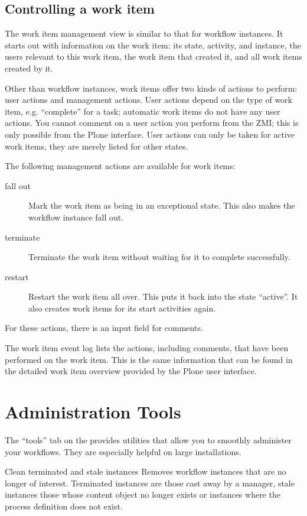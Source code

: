 \subsection{Controlling a work item}

The work item management view is similar to that for workflow instances. It
starts out with information on the work item: its state, activity, and
instance, the users relevant to this work item, the work item that created it,
and all work items created by it.

Other than workflow instances, work items offer two kinds of actions to
perform: user actions and management actions. User actions depend on the type
of work item, e.g. ``complete'' for a task; automatic work items do not have
any user actions. You cannot comment on a user action you perform from the
ZMI; this is only possible from the Plone interface. User actions can only be
taken for active work items, they are merely listed for other states.

The following management actions are available for work items:
\begin{description}
\item[fall out] Mark the work item as being in an exceptional state. This also
  makes the workflow instance fall out.
\item[terminate] Terminate the work item without waiting for it to complete
  successfully.
\item[restart] Restart the work item all over. This puts it back into the
  state ``active''. It also creates work items for its start activities again.
\end{description}
For these actions, there is an input field for comments.

The work item event log lists the actions, including comments, that have been
performed on the work item. This is the same information that can be found in
the detailed work item overview provided by the Plone user interface.

\section{Administration Tools}

The "`tools"' tab on the  provides utilities that
allow you to smoothly administer your workflows. They are especially helpful
on large installations.

\begin{memberdesc}{Clean terminated and stale instances} Removes workflow
    instances that are no longer of interest. Terminated instances are those
    cast away by a manager, stale instances those whose content object no
    longer exists or instances where the process definition does not exist. 
\end{memberdesc}

